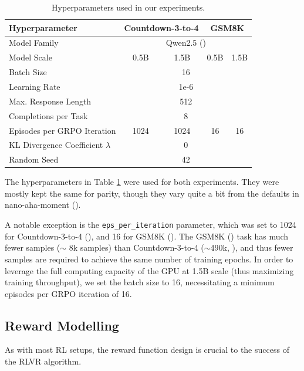 \documentclass{article} %
\theoremstyle{definition}
\begin{document}
\begin{table}[h]
    \centering
    \begin{tabular}{|l|c|c|c|c|}
        \hline
        \textbf{Hyperparameter} & \multicolumn{2}{c|}{\textbf{Countdown-3-to-4}} & \multicolumn{2}{|c|}{\textbf{GSM8K}} \\
        \hline
        Model Family & \multicolumn{4}{c|}{Qwen2.5 (\cite{Qwen-et-al-2025})} \\
        \hline
        Model Scale & 0.5B & 1.5B & 0.5B & 1.5B \\
        \hline
        Batch Size & \multicolumn{4}{c|}{16} \\
        \hline
        Learning Rate & \multicolumn{4}{c|}{1e-6} \\
        \hline
        Max. Response Length & \multicolumn{4}{c|}{512} \\
        \hline
        Completions per Task & \multicolumn{4}{c|}{8} \\
        \hline
        Episodes per GRPO Iteration & 1024 & 1024 & 16 & 16\\
        \hline
        KL Divergence Coefficient $\lambda$ & \multicolumn{4}{c|}{0} \\
        \hline
        Random Seed & \multicolumn{4}{c|}{42} \\
        \hline
    \end{tabular}
    \caption{Hyperparameters used in our experiments.}
    \label{tab:hyperparams}
\end{table}

The hyperparameters in Table \ref{tab:hyperparams} were used for both experiments.
They were mostly kept the same for parity, though they vary quite
a bit from the defaults in nano-aha-moment (\cite{nano-aha-moment}).

A notable exception is the \texttt{eps\_per\_iteration} parameter, which was set to 1024 for Countdown-3-to-4 (\cite{countdown}),
and 16 for GSM8K (\cite{gsm8k}). The GSM8K (\cite{gsm8k}) task has much fewer samples ($\sim$ 8k samples) than Countdown-3-to-4 ($\sim$490k, \cite{countdown}),
and thus fewer samples are required to achieve the same number of training epochs. In order to
leverage the full computing capacity of the GPU at 1.5B scale (thus maximizing training throughput),
we set the batch size to 16, necessitating a minimum episodes per GRPO iteration of 16.

\subsection{Reward Modelling}
As with most RL setups, the reward function design is crucial to the success of the RLVR algorithm.
\end{document}
